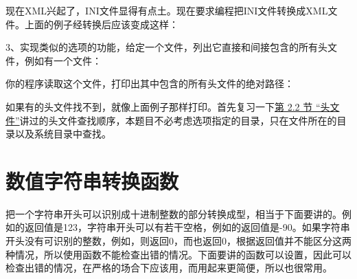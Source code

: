 现在XML兴起了，INI文件显得有点土。现在要求编程把INI文件转换成XML文件。上面的例子经转换后应该变成这样：




3、实现类似的选项的功能，给定一个文件，列出它直接和间接包含的所有头文件，例如有一个文件：




你的程序读取这个文件，打印出其中包含的所有头文件的绝对路径：




如果有的头文件找不到，就像上面例子那样打印。首先复习一下\hyperlink{db.ch20s02.id2788051}{第 2.\BookSplit{}2 节 “头文件”}讲过的头文件查找顺序，本题目不必考虑选项指定的目录，只在文件所在的目录以及系统目录中查找。




\section{数值字符串转换函数}
%


把一个字符串开头可以识别成十进制整数的部分转换成型，相当于下面要讲的。例如的返回值是123，字符串开头可以有若干空格，例如的返回值是-90。如果字符串开头没有可识别的整数，例如，则返回0，而也返回0，根据返回值并不能区分这两种情况，所以使用函数不能检查出错的情况。下面要讲的函数可以设置，因此可以检查出错的情况，在严格的场合下应该用，而用起来更简便，所以也很常用。



